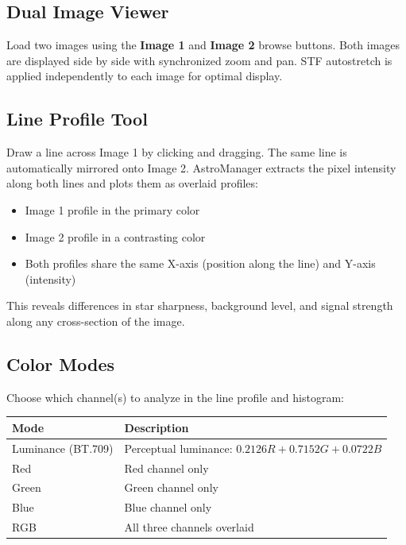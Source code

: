 \documentclass[11pt,a4paper]{article}
\begin{document}
\subsection{Dual Image Viewer}

Load two images using the \textbf{Image 1} and \textbf{Image 2} browse buttons. Both images are displayed side by side with synchronized zoom and pan. STF autostretch is applied independently to each image for optimal display.

\subsection{Line Profile Tool}

Draw a line across Image 1 by clicking and dragging. The same line is automatically mirrored onto Image 2. AstroManager extracts the pixel intensity along both lines and plots them as overlaid profiles:

\begin{itemize}
    \item Image 1 profile in the primary color
    \item Image 2 profile in a contrasting color
    \item Both profiles share the same X-axis (position along the line) and Y-axis (intensity)
\end{itemize}

This reveals differences in star sharpness, background level, and signal strength along any cross-section of the image.

\subsection{Color Modes}

Choose which channel(s) to analyze in the line profile and histogram:

\begin{center}
\begin{tabular}{lp{8cm}}
\toprule
\textbf{Mode} & \textbf{Description} \\
\midrule
Luminance (BT.709) & Perceptual luminance: $0.2126 R + 0.7152 G + 0.0722 B$ \\
Red & Red channel only \\
Green & Green channel only \\
Blue & Blue channel only \\
RGB & All three channels overlaid \\
\bottomrule
\end{tabular}
\end{center}
\end{document}
